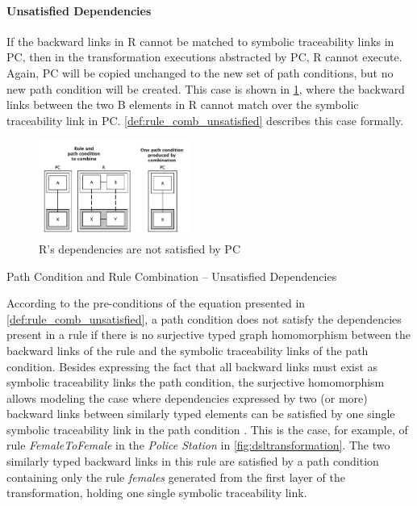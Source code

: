 \paragraph{Unsatisfied Dependencies}


If the backward links in R cannot be matched to symbolic traceability links in PC, then in the transformation executions abstracted by PC, R cannot execute. Again, PC will be copied unchanged to the new set of path conditions, but no new path condition will be created. This case is shown in \cref{fig:non_satisfied_dependencies}, where the backward links between the two B elements in R cannot match over the symbolic traceability link in PC. \cref{def:rule_comb_unsatisfied} describes this case formally.

\begin{figure}[h!] \centering \includegraphics[width=0.44\textwidth]{./figures/building_path_conditions/non_satisfied_dependencies.pdf}
	\caption{R's dependencies are not satisfied by PC}
	\label{fig:non_satisfied_dependencies}
\end{figure}

\begin{definition}{Path Condition and Rule Combination -- Unsatisfied Dependencies\\} 
\label{def:rule_comb_unsatisfied}
\end{definition}

According to the pre-conditions of the equation presented in \cref{def:rule_comb_unsatisfied}, a path condition does not satisfy the dependencies present in a rule if there is no surjective typed graph homomorphism between the backward links of the rule and the symbolic traceability links of the path condition. Besides expressing the fact that all backward links must exist as symbolic traceability links the path condition, the surjective homomorphism allows modeling the case where dependencies expressed by two (or more) backward links between similarly typed elements can be satisfied by one single symbolic traceability link in the path condition . This is the case, for example, of rule \emph{FemaleToFemale} in the \emph{Police Station} in \cref{fig:dsltransformation}. The two similarly typed backward links in this rule are satisfied by a path condition containing only the rule \emph{females} generated from the first layer of the transformation, holding one single symbolic traceability link.



